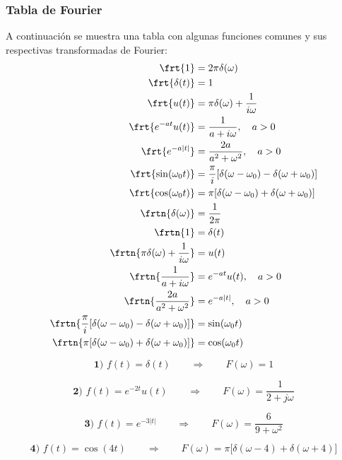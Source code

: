 \documentclass[12pt]{article}
\begin{document}
\subsubsection{Tabla de Fourier}
A continuación se muestra una tabla con algunas funciones comunes y sus respectivas transformadas de Fourier:
$$
\begin{aligned}
  \frt{1} &= 2\pi\delta(\omega)\\
  \frt{\delta(t)} &= 1\\
  \frt{u(t)} &= \pi\delta(\omega) + \frac{1}{i\omega}\\
  \frt{e^{-at}u(t)} &= \frac{1}{a + i\omega}, \quad a > 0\\
  \frt{e^{-a|t|}} &= \frac{2a}{a^2 + \omega^2}, \quad a > 0\\
  \frt{\sin(\omega_0 t)} &= \frac{\pi}{i}[\delta(\omega - \omega_0) - \delta(\omega + \omega_0)]\\
  \frt{\cos(\omega_0 t)} &= \pi[\delta(\omega - \omega_0) + \delta(\omega + \omega_0)]\\
  \frtn{\delta(\omega)} &= \frac{1}{2\pi}\\
  \frtn{1} &= \delta(t)\\
  \frtn{\pi\delta(\omega) + \frac{1}{i\omega}} &= u(t)\\
  \frtn{\frac{1}{a + i\omega}} &= e^{-at}u(t), \quad a > 0\\
  \frtn{\frac{2a}{a^2 + \omega^2}} &= e^{-a|t|}, \quad a > 0\\
  \frtn{\frac{\pi}{i}[\delta(\omega - \omega_0) - \delta(\omega + \omega_0)]} &= \sin(\omega_0 t)\\
  \frtn{\pi[\delta(\omega - \omega_0) + \delta(\omega + \omega_0)]} &= \cos(\omega_0 t)
\end{aligned}
  $$

\[
\textbf{1) } f(t)=\delta(t)
\qquad\Longrightarrow\qquad
F(\omega)=1
\]

\[
\textbf{2) } f(t)=e^{-2t}u(t)
\qquad\Longrightarrow\qquad
F(\omega)=\frac{1}{2+j\omega}
\]

\[
\textbf{3) } f(t)=e^{-3|t|}
\qquad\Longrightarrow\qquad
F(\omega)=\frac{6}{9+\omega^2}
\]

\[
\textbf{4) } f(t)=\cos(4t)
\qquad\Longrightarrow\qquad
F(\omega)=\pi\big[\delta(\omega-4)+\delta(\omega+4)\big]
\]
\end{document}
